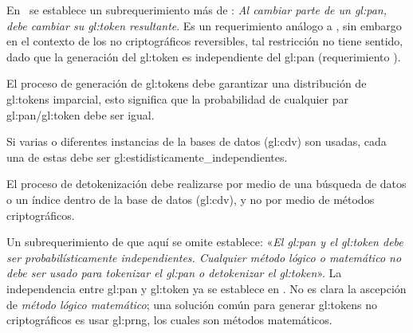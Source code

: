 En~\cite{pci_tokens} se establece un subrequerimiento más de
: \textit{Al cambiar parte de un
\gls{gl:pan}, debe cambiar su \gls{gl:token} resultante}. Es un requerimiento
análogo a , sin embargo en el contexto
de los  no criptográficos reversibles, tal restricción no tiene sentido, dado
que  la generación del \gls{gl:token} es independiente del \gls{gl:pan}
(requerimiento ).

{
  El proceso de generación de \glspl{gl:token} debe garantizar una
  distribución de \glspl{gl:token} imparcial, esto significa que la
  probabilidad de cualquier par \gls{gl:pan}/\gls{gl:token} debe ser igual.
}

{
  Si varias o diferentes instancias de la bases de datos (\gls{gl:cdv}) son
  usadas, cada una de estas debe ser \glspl{gl:estidisticamente_independiente}.
}

{
  El proceso de detokenización debe realizarse por medio de una búsqueda de
  datos o un índice dentro de la base de datos (\gls{gl:cdv}), y no por medio
  de métodos criptográficos.
}


Un subrequerimiento de  que
aquí se omite establece: «\textit{El \gls{gl:pan} y el \gls{gl:token} debe ser
probabilísticamente independientes. Cualquier método lógico o matemático no
debe ser usado para \textit{tokenizar} el \gls{gl:pan} o \textit{detokenizar}
el \gls{gl:token}}». La independencia entre \gls{gl:pan} y \gls{gl:token} ya
se establece en . No es
clara la ascepción de \textit{método lógico matemático}; una solución
común para generar \glspl{gl:token} no criptográficos es usar \gls{gl:prng},
los cuales son métodos matemáticos.

